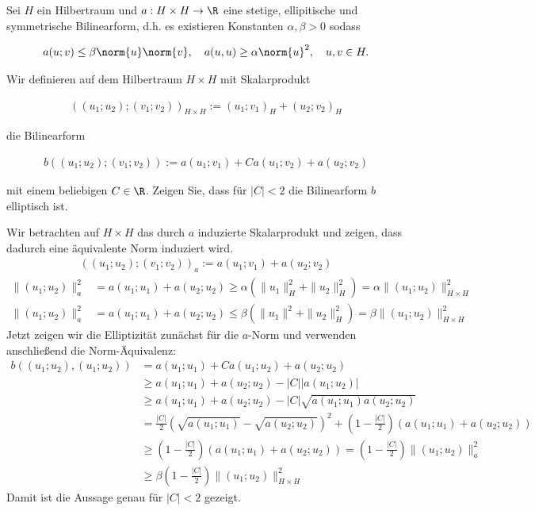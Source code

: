 
\begin{exercise}
Sei $H$ ein Hilbertraum und $a: H \times H \rightarrow \R$ eine stetige,
ellipitische und symmetrische Bilinearform, d.h. es existieren Konstanten
$\alpha, \beta > 0$ sodass

\begin{align*}
  a(u;v)
  \leq
  \beta \norm{u}\norm{v},
  \quad
  a(u,u) \geq \alpha \norm{u}^2,
  \quad
  u,v \in H.
\end{align*}

Wir definieren auf dem Hilbertraum $H \times H$ mit Skalarprodukt

\begin{align*}
  ((u_1;u_2);(v_1;v_2))_{H \times H} := (u_1;v_1)_H + (u_2;v_2)_H
\end{align*}

die Bilinearform

\begin{align*}
  b((u_1;u_2);(v_1;v_2)) := a(u_1;v_1) + Ca(u_1;v_2) + a(u_2;v_2)
\end{align*}

mit einem beliebigen $C \in \R$. Zeigen Sie, dass für $|C| < 2$ die Bilinearform $b$
elliptisch ist.
\end{exercise}


\begin{solution}
Wir betrachten auf $H \times H$ das durch $a$ induzierte Skalarprodukt und zeigen,
dass dadurch eine äquivalente Norm induziert wird.
\begin{align*}
  ((u_1;u_2);(v_1;v_2))_a := a(u_1;v_1) + a(u_2;v_2)
\end{align*}
\begin{align*}
  \|(u_1;u_2)\|_a^2 &= a(u_1;u_1) + a(u_2;u_2) \geq \alpha (\|u_1\|_H^2 + \|u_2\|_H^2)
  = \alpha \|(u_1;u_2)\|_{H \times H}^2 \\
  \|(u_1;u_2)\|_a^2 &= a(u_1;u_1) + a(u_2;u_2) \leq \beta (\|u_1\|^2 + \|u_2\|_H^2)
  = \beta \|(u_1;u_2)\|_{H \times H}^2
\end{align*}
Jetzt zeigen wir die Elliptizität zunächst für die $a$-Norm und verwenden anschließend
die Norm-Äquivalenz:
\begin{align*}
  b((u_1;u_2),(u_1;u_2)) &= a(u_1;u_1) + Ca(u_1;u_2) + a(u_2;u_2) \\
  &\geq a(u_1;u_1) + a(u_2;u_2) - |C||a(u_1;u_2)| \\
  &\geq a(u_1;u_1) + a(u_2;u_2) - |C|\sqrt{a(u_1;u_1)a(u_2;u_2)} \\
  &= \frac{|C|}{2}\left(\sqrt{a(u_1;u_1)} - \sqrt{a(u_2;u_2)}\right)^2
  + \left(1 - \frac{|C|}{2}\right)(a(u_1;u_1) + a(u_2;u_2)) \\
  &\geq \left(1 - \frac{|C|}{2}\right)(a(u_1;u_1) + a(u_2;u_2))
  = \left(1 - \frac{|C|}{2}\right)\|(u_1;u_2)\|_a^2 \\
  &\geq \beta\left(1 - \frac{|C|}{2}\right)\|(u_1;u_2)\|_{H \times H}^2
\end{align*}
Damit ist die Aussage genau für $|C| < 2$ gezeigt.
\end{solution}

